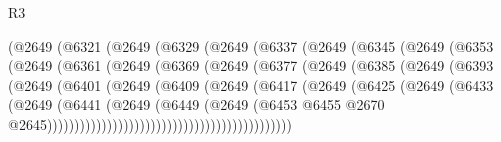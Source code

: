 \begin{lexlean}{R3}
\begin{coremodule}
                      (@2649
                        (@6321
                          (@2649
                            (@6329
                              (@2649
                                (@6337
                                  (@2649
                                    (@6345
                                      (@2649
                                        (@6353
                                          (@2649
                                            (@6361
                                              (@2649
                                                (@6369
                                                  (@2649
                                                    (@6377
                                                      (@2649
                                                        (@6385
                                                          (@2649
                                                            (@6393
                                                              (@2649
                                                                (@6401
                                                                  (@2649
                                                                    (@6409
                                                                      (@2649
                                                                        (@6417
                                                                          (@2649
                                                                            (@6425
                                                                              (@2649
                                                                                (@6433
                                                                                  (@2649
                                                                                    (@6441
                                                                                      (@2649
                                                                                        (@6449
                                                                                          (@2649
                                                                                            (@6453
                                                                                              @6455
                                                                                              @2670
                                                                                              @2645)))))))))))))))))))))))))))))))))))))))))))))

\end{coremodule}
\end{lexlean}
